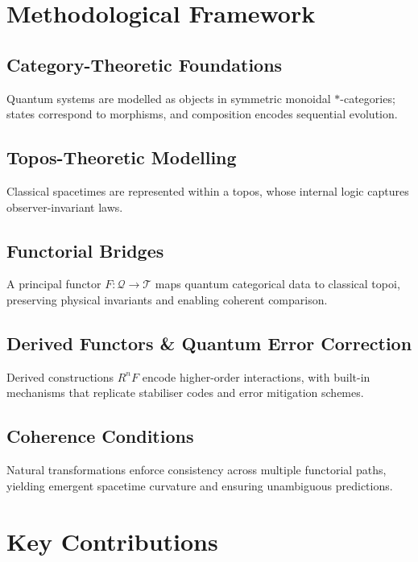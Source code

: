 \documentclass[11pt]{article}
\begin{document}
\section{Methodological Framework}
\subsection{Category-Theoretic Foundations}
Quantum systems are modelled as objects in symmetric monoidal $*$-categories; states correspond to morphisms, and composition encodes sequential evolution.

\subsection{Topos-Theoretic Modelling}
Classical spacetimes are represented within a topos, whose internal logic captures observer-invariant laws.

\subsection{Functorial Bridges}
A principal functor $F\colon \mathcal{Q} \to \mathcal{T}$ maps quantum categorical data to classical topoi, preserving physical invariants and enabling coherent comparison.

\subsection{Derived Functors \& Quantum Error Correction}
Derived constructions $R^nF$ encode higher-order interactions, with built-in mechanisms that replicate stabiliser codes and error mitigation schemes.

\subsection{Coherence Conditions}
Natural transformations enforce consistency across multiple functorial paths, yielding emergent spacetime curvature and ensuring unambiguous predictions.

\section{Key Contributions}
\end{document}
